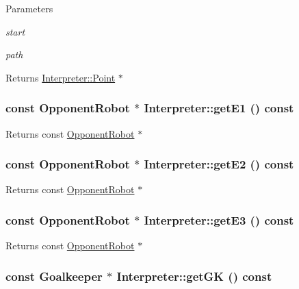 \begin{DoxyParams}{Parameters}
\item[{\em start}]\item[{\em path}]\end{DoxyParams}
\begin{DoxyReturn}{Returns}
\hyperlink{structInterpreter_1_1Point}{Interpreter::Point} $\ast$ 
\end{DoxyReturn}
\hypertarget{classInterpreter_acf9d8aba6db6063eb28e290ae1d4b655}{
\subsubsection[{getE1}]{\setlength{\rightskip}{0pt plus 5cm}const {\bf OpponentRobot} $\ast$ Interpreter::getE1 () const}}
\label{classInterpreter_acf9d8aba6db6063eb28e290ae1d4b655}
\begin{DoxyReturn}{Returns}
const \hyperlink{classOpponentRobot}{OpponentRobot} $\ast$ 
\end{DoxyReturn}
\hypertarget{classInterpreter_a46195d271e54a0e832876364562e4925}{
\subsubsection[{getE2}]{\setlength{\rightskip}{0pt plus 5cm}const {\bf OpponentRobot} $\ast$ Interpreter::getE2 () const}}
\label{classInterpreter_a46195d271e54a0e832876364562e4925}
\begin{DoxyReturn}{Returns}
const \hyperlink{classOpponentRobot}{OpponentRobot} $\ast$ 
\end{DoxyReturn}
\hypertarget{classInterpreter_a71c179ef0fa2c3372733dcae42799da3}{
\subsubsection[{getE3}]{\setlength{\rightskip}{0pt plus 5cm}const {\bf OpponentRobot} $\ast$ Interpreter::getE3 () const}}
\label{classInterpreter_a71c179ef0fa2c3372733dcae42799da3}
\begin{DoxyReturn}{Returns}
const \hyperlink{classOpponentRobot}{OpponentRobot} $\ast$ 
\end{DoxyReturn}
\hypertarget{classInterpreter_ac086d0ece936720419817ec19ebc3d8d}{
\subsubsection[{getGK}]{\setlength{\rightskip}{0pt plus 5cm}const {\bf Goalkeeper} $\ast$ Interpreter::getGK () const}}
